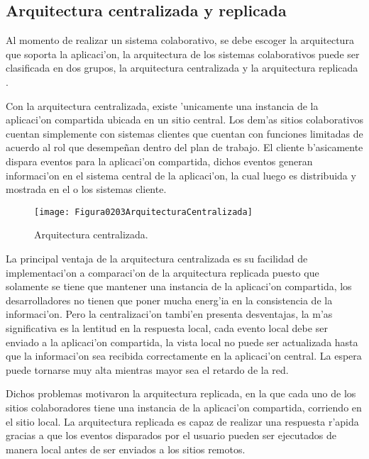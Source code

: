 \subsection{Arquitectura centralizada y replicada}

Al momento de realizar un sistema colaborativo, se debe escoger la arquitectura que soporta la aplicaci'on, la arquitectura de los sistemas colaborativos puede ser clasificada en dos grupos, la arquitectura centralizada y la arquitectura replicada  \cite{lauwers1990replicated}.

\medskip
Con la arquitectura centralizada, existe 'unicamente una instancia de la aplicaci'on compartida ubicada en un sitio central. Los dem'as sitios colaborativos cuentan simplemente con sistemas clientes que cuentan con funciones limitadas de acuerdo al rol que desempe\~nan dentro del plan de trabajo. El cliente b'asicamente dispara eventos para la aplicaci'on compartida, dichos eventos generan informaci'on en el sistema central de la aplicaci'on, la cual luego es distribuida y mostrada en el o los sistemas cliente.

\begin{figure}[ht]
    \centering
    \texttt{[image: Figura0203ArquitecturaCentralizada]}
    \caption{Arquitectura centralizada.}
    \cite{lauwers1990replicated}
    \label{fig:ArquitecturaCentralizada}
\end{figure}
\medskip

La principal ventaja de la arquitectura centralizada es su facilidad de implementaci'on a comparaci'on de la arquitectura replicada puesto que solamente se tiene que mantener una instancia de la aplicaci'on compartida, los desarrolladores no tienen que poner mucha energ'ia en la consistencia de la informaci'on. Pero la centralizaci'on tambi'en presenta desventajas, la m'as significativa es la lentitud en la respuesta local, cada evento local debe ser enviado a la aplicaci'on compartida, la vista local no puede ser actualizada hasta que la informaci'on sea recibida correctamente en la aplicaci'on central. La espera puede tornarse muy alta mientras mayor sea el retardo de la red. 

\medskip
Dichos problemas motivaron la arquitectura replicada, en la que cada uno de los sitios colaboradores tiene una instancia de la aplicaci'on compartida, corriendo en el sitio local. La arquitectura replicada es capaz de realizar una respuesta r'apida gracias a que los eventos disparados por el usuario pueden ser ejecutados de manera local antes de ser enviados a los sitios remotos. 

